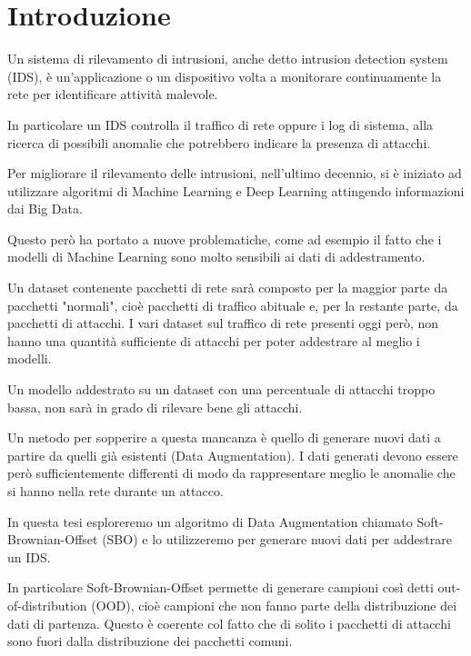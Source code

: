 \chapter{Introduzione}

Un sistema di rilevamento di intrusioni, anche detto intrusion detection system (IDS),  è un'applicazione o un dispositivo volta a monitorare continuamente la rete per identificare attività malevole. 

In particolare un IDS controlla il traffico di rete oppure i log di sistema, alla ricerca di possibili anomalie che potrebbero indicare la presenza di attacchi.

Per migliorare il rilevamento delle intrusioni, nell'ultimo decennio, si è iniziato ad utilizzare algoritmi di Machine Learning e Deep Learning attingendo informazioni dai Big Data. \cite{NetworkIntrusionDetection2021}

Questo però ha portato a nuove problematiche, come ad esempio il fatto che i modelli di Machine Learning sono molto sensibili ai dati di addestramento.


Un dataset contenente pacchetti di rete sarà composto per la maggior parte da pacchetti "normali", cioè pacchetti di traffico abituale e, per la restante parte, da pacchetti di attacchi. 
I vari dataset sul traffico di rete presenti oggi però, non hanno una quantità sufficiente di attacchi per poter addestrare al meglio i modelli. 

Un modello addestrato su un dataset con una percentuale di attacchi troppo bassa, non sarà in grado di rilevare bene gli attacchi.

Un metodo per sopperire a questa mancanza è quello di generare nuovi dati a partire da quelli già esistenti (Data Augmentation). I dati generati devono essere però sufficientemente differenti di modo da rappresentare meglio le anomalie che si hanno nella rete durante un attacco.


In questa tesi esploreremo un algoritmo di Data Augmentation chiamato Soft-Brownian-Offset (SBO) \cite{sbo} e lo utilizzeremo per generare nuovi dati per addestrare un IDS.

In particolare Soft-Brownian-Offset permette di generare campioni così detti out-of-distribution (OOD), cioè campioni che non fanno parte della distribuzione dei dati di partenza. Questo è coerente col fatto che di solito i pacchetti di attacchi sono fuori dalla distribuzione dei pacchetti comuni.



